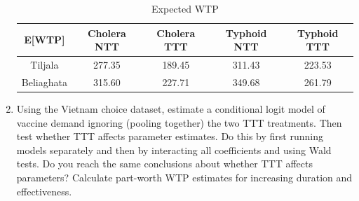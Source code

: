 \documentclass[12pt]{article}
\begin{document}
\begin{enumerate}
\begin{table}[h]
\caption {Expected WTP}
\begin{tabular}{c c c c c}
\hline\hline
E[WTP] &  Cholera NTT &  Cholera TTT & Typhoid NTT & Typhoid TTT  \\ [0.5ex] %
\hline
Tiljala & 277.35 &189.45 & 311.43 & 223.53\\
Beliaghata &315.60 &227.71 & 349.68 & 261.79 \\ [1ex]
\hline
\end{tabular}
\label{table:wtp}
\end{table}
\FloatBarrier

\item Using the Vietnam choice dataset, estimate a conditional logit model of vaccine demand ignoring (pooling together) the two TTT treatments.  Then test whether TTT affects parameter estimates.  Do this by first running models separately and then by interacting all coefficients and using Wald tests.  Do you reach the same conclusions about whether TTT affects parameters?  Calculate part-worth WTP estimates for increasing duration and effectiveness.\\


\end{enumerate}
\end{document}
